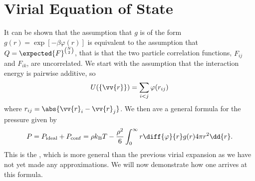 \documentclass[fleqn]{NotesClass}
\newcommand*{\boltzmann}{k_{\mathrm{B}}}
\begin{document}
    \section{Virial Equation of State}
    It can be shown that the assumption that \(g\) is of the form \(g(r) = \exp[-\beta\varphi(r)]\) is equivalent to the assumption that \(Q = \expected{F}^{\binom{N}{2}}\), that is that the two particle correlation functions, \(F_{ij}\) and \(F_{ik}\), are uncorrelated.
    We start with the assumption that the interaction energy is pairwise additive, so
    \begin{equation}
        U(\{\vv{r}\}) = \sum_{i < j} \varphi(r_{ij})
    \end{equation}
    where \(r_{ij} = \abs{\vv{r}_i - \vv{r}_j}\).
    We then ave a general formula for the pressure given by
    \begin{equation}
        P = P_{\mathrm{ideal}} + P_{\mathrm{conf}} = \rho \boltzmann T - \frac{\rho^2}{6} \int_{0}^{\infty} r\diff{\varphi}{r} g(r) 4\pi r^2 \dd{r}.
    \end{equation}
    This is the , which is more general than the previous virial expansion as we have not yet made any approximations.
    We will now demonstrate how one arrives at this formula.
    
\end{document}
